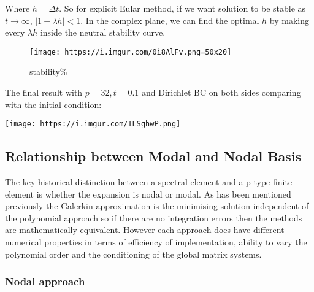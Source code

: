 \documentclass[
  a4paper,
  10pt]{article}
\begin{document}
Where \(h=\Delta t\). So for explicit Eular method, if we want solution
to be stable as \(t\to\infty\), \(|1+\lambda h|<1\). In the complex
plane, we can find the optimal \(h\) by making every \(\lambda h\)
inside the neutral stability curve.

\begin{figure}
\centering
\texttt{[image: https://i.imgur.com/0i8AlFv.png=50x20]}
\caption{stability\%}
\end{figure}

The final result with \(p=32, t=0.1\) and Dirichlet BC on both sides
comparing with the initial condition:

\texttt{[image: https://i.imgur.com/ILSghwP.png]}

\hypertarget{relationship-between-modal-and-nodal-basis}{%
\subsection{Relationship between Modal and Nodal
Basis}\label{relationship-between-modal-and-nodal-basis}}

The key historical distinction between a spectral element and a p-type
finite element is whether the expansion is nodal or modal. As has been
mentioned previously the Galerkin approximation is the minimising
solution independent of the polynomial approach so if there are no
integration errors then the methods are mathematically equivalent.
However each approach does have different numerical properties in terms
of efficiency of implementation, ability to vary the polynomial order
and the conditioning of the global matrix systems.

\hypertarget{nodal-approach}{%
\subsubsection{Nodal approach}\label{nodal-approach}}
\end{document}
